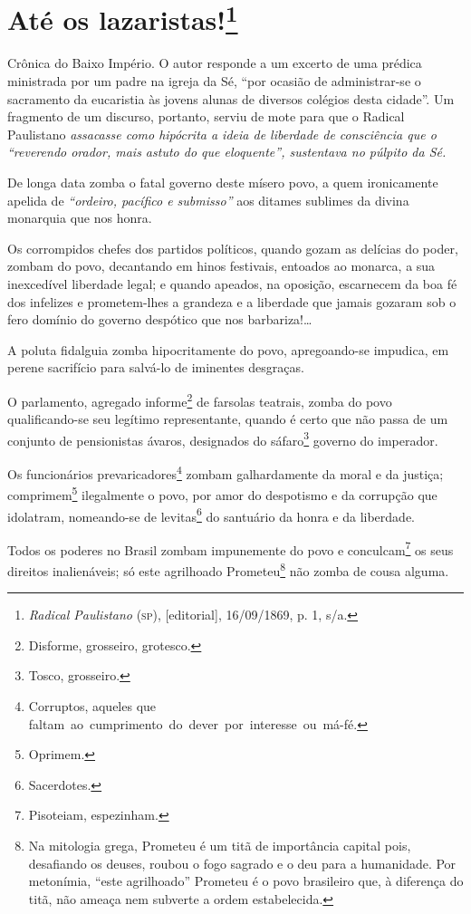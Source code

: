\chapter{Até os lazaristas!\footnote{\emph{Radical Paulistano} (\textsc{sp}),
  {[}editorial{]}, 16/09/1869, p. 1, s/a.}}

\begin{didascalia}
Crônica do Baixo Império. O autor responde a um excerto de uma prédica
ministrada por um padre na igreja da Sé, ``por ocasião de administrar-se
o sacramento da eucaristia às jovens alunas de diversos colégios desta
cidade''. Um fragmento de um discurso, portanto, serviu de mote para que
o Radical Paulistano \emph{assacasse como hipócrita a ideia de liberdade
de consciência que o ``reverendo orador, mais astuto do que eloquente'',
sustentava no púlpito da Sé.}
\end{didascalia}



De longa data zomba o fatal governo deste mísero povo, a quem
ironicamente apelida de \emph{``ordeiro, pacífico e submisso''} aos
ditames sublimes da divina monarquia que nos honra.

Os corrompidos chefes dos partidos políticos, quando gozam as delícias
do poder, zombam do povo, decantando em hinos festivais, entoados ao
monarca, a sua inexcedível liberdade legal; e quando apeados, na
oposição, escarnecem da boa fé dos infelizes e prometem-lhes a grandeza
e a liberdade que jamais gozaram sob o fero domínio do governo despótico
que nos barbariza!\ldots{}

A poluta fidalguia zomba hipocritamente do povo, apregoando-se impudica,
em perene sacrifício para salvá-lo de iminentes desgraças.

O parlamento, agregado informe\footnote{Disforme, grosseiro, grotesco.}
de farsolas teatrais, zomba do povo qualificando-se seu legítimo
representante, quando é certo que não passa de um conjunto de
pensionistas ávaros, designados do sáfaro\footnote{Tosco, grosseiro.}
governo do imperador.

Os funcionários prevaricadores\footnote{Corruptos, aqueles que
  faltam~ao~cumprimento~do~dever~por~interesse~ou~má-fé.} zombam
galhardamente da moral e da justiça; comprimem\footnote{Oprimem.}
ilegalmente o povo, por amor do despotismo e da corrupção que idolatram,
nomeando-se de levitas\footnote{Sacerdotes.} do santuário da honra e
da liberdade.

Todos os poderes no Brasil zombam impunemente do povo e
conculcam\footnote{Pisoteiam, espezinham.} os seus direitos
inalienáveis; só este agrilhoado Prometeu\footnote{Na mitologia grega,
  Prometeu é um titã de importância capital pois, desafiando os deuses,
  roubou o fogo sagrado e o deu para a humanidade. Por metonímia, ``este
  agrilhoado'' Prometeu é o povo brasileiro que, à diferença do titã, não
  ameaça nem subverte a ordem estabelecida.} não zomba de cousa alguma.

